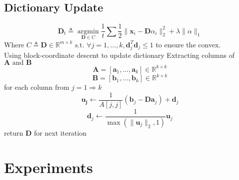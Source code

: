 \documentclass[UTF8]{article}
\begin{document}
    \subsection{Dictionary Update}
    \[\bm{D}_t \triangleq \mathop{\arg\min}\limits_{\bm{D} \in C} \frac{1}{t} \sum{ \frac{1}{2} \| \bm{x}_i - \bm{D} \alpha_i  \|^2_2 + \lambda \|\alpha\|_1}
    \]
    Where $C \triangleq {\bm{D} \in \mathbb{R}^{m \times k} \text{ s.t. } \forall j = 1, ..., k, \bm{d}_j^T\bm{d}_j \leq 1}$ to ensure the convex.
    \\
    Using block-coordinate descent to update dictionary
    Extracting columns of $\bm{A} \text{ and } \bm{B}$
    \[\bm{A} = [\bm{a}_1, ..., \bm{a}_k] \in \mathbb{R}^{k \times k}\]
    \[\bm{B} = [\bm{b}_1, ..., \bm{b}_k] \in \mathbb{R}^{k \times k}\]
    for each column from $j = 1 \Rightarrow k$
    \[\bm{u_j} \leftarrow \frac{1}{A[j, j]}(\bm{b}_j - \bm{Da}_j) + \bm{d}_j\]
    \[\bm{d}_j \leftarrow \frac{1}{\max(\|\bm{u}_j\|_2, 1)}\bm{u}_j\]
    return $\bm{D}$ for next iteration
    \section{Experiments}
    \subsection{}
\end{document}
